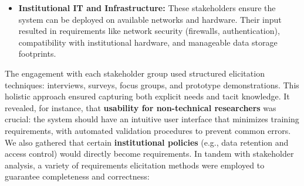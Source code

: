 \documentclass[11pt,a4paper]{report}
\begin{document}
\begin{itemize}
\item \textbf{Institutional IT and Infrastructure:} These stakeholders ensure the system can be deployed on available networks and hardware. Their input resulted in requirements like network security (firewalls, authentication), compatibility with institutional hardware, and manageable data storage footprints.
\end{itemize} The engagement with each stakeholder group used structured elicitation techniques: interviews, surveys, focus groups, and prototype demonstrations. This holistic approach ensured capturing both explicit needs and tacit knowledge. It revealed, for instance, that \textbf{usability for non-technical researchers} was crucial: the system should have an intuitive user interface that minimizes training requirements, with automated validation procedures to prevent common errors. We also gathered that certain \textbf{institutional policies} (e.g., data retention and access control) would directly become requirements. In tandem with stakeholder analysis, a variety of requirements elicitation methods were employed to guarantee completeness and correctness:
\end{document}
